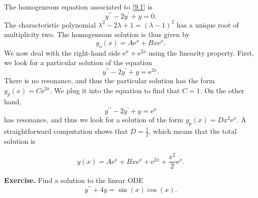 \documentclass[a4paper,10 pt]{report}
\newcommand{\finalanswer}[1]{%
    \begin{finalAnswer}
    \[
        #1
    \]
    \end{finalAnswer}
}
\theoremstyle{definition}
\begin{document}
\begin{solutionBox} The homogeneous equation associated to \eqref{9.1} is
\begin{equation} \label{9.1.1} y^{\prime \prime} - 2y^\prime + y = 0. \end{equation}
The characteristic polynomial $\lambda^2 - 2\lambda + 1 = (\lambda - 1)^2$ has a unique root of multiplicity two. The homogeneous solution is thus given by
\begin{equation*} y_o(x) = A \mathrm{e}^x + Bx \mathrm{e}^{x}. \end{equation*}
We now deal with the right-hand side $\mathrm{e}^x + \mathrm{e}^{2x}$ using the linearity property. First, we look for a particular solution of the equation
\begin{equation*} y^{\prime \prime} - 2y^\prime + y =  \mathrm{e}^{2x}. \end{equation*}
There is no resonance, and thus the particular solution has the form $y_p(x) = C \mathrm{e}^{2x}$. We plug it into the equation to find that $C = 1$. On the other hand,
\begin{equation*} y^{\prime \prime} - 2y^\prime + y =  \mathrm{e}^{x} \end{equation*}
has resonance, and thus we look for a solution of the form $y_p(x) = D x^2 \mathrm{e}^x$. A straightforward computation shows that $D = \frac{1}{2}$, which means that the total solution is
\finalanswer{
y(x) = A \mathrm{e}^x + Bx \mathrm{e}^{x} + \mathrm{e}^{2x} + \frac{x^2}{2} \mathrm{e}^x.
}
\end{solutionBox}

\begin{exerciseBox} \textbf{Exercise.}  Find a solution to the linear ODE
\begin{equation} \label{9.2} y^{\prime \prime} + 4y = \sin(x) \cos(x). \end{equation} \end{exerciseBox}
\end{document}
